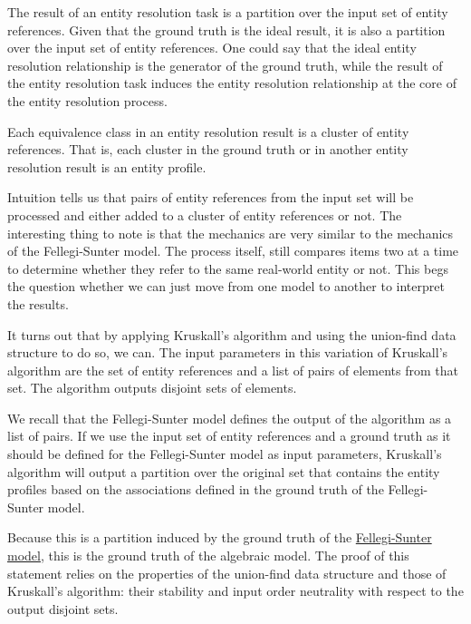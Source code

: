 \documentclass[11pt]{article}
\begin{document}
    The result of an entity resolution task is a partition over the input set of
    entity references.
    Given that the ground truth is the ideal result, it is also a partition over
    the input set of entity references.
    One could say that the ideal entity resolution relationship is the generator
    of the ground truth, while the result of the entity resolution task induces
    the entity resolution relationship at the core of the entity resolution
    process.
    
    Each equivalence class in an entity resolution result is a cluster of entity
    references.
    That is, each cluster in the ground truth or in another entity resolution
    result is an entity profile.

    Intuition tells us that pairs of entity references from the input set will
    be processed and either added to a cluster of entity references or not.
    The interesting thing to note is that the mechanics are very similar to
    the mechanics of the Fellegi-Sunter model.
    The process itself, still compares items two at a time to determine whether
    they refer to the same real-world entity or not.
    This begs the question whether we can just move from one model to another
    to interpret the results.

    It turns out that by applying Kruskall's algorithm and using the union-find
    data structure to do so, we can.
    The input parameters in this variation of Kruskall's algorithm are the set
    of entity references and a list of pairs of elements from that set.
    The algorithm outputs disjoint sets of elements.

    We recall that the Fellegi-Sunter model defines the output of the algorithm
    as a list of pairs.
    If we use the input set of entity references and a ground truth as it should
    be defined for the Fellegi-Sunter model as input parameters, Kruskall's
    algorithm will output a partition over the original set that contains the
    entity profiles based on the associations defined in the ground truth of the
    Fellegi-Sunter model.

    Because this is a partition induced by the ground truth of the
    \hyperref[subsec:fsm]{Fellegi-Sunter model}, this is the ground truth of the
    algebraic model.
    The proof of this statement relies on the properties of the union-find data
    structure and those of Kruskall's algorithm: their stability and input order
    neutrality with respect to the output disjoint sets.
\end{document}
